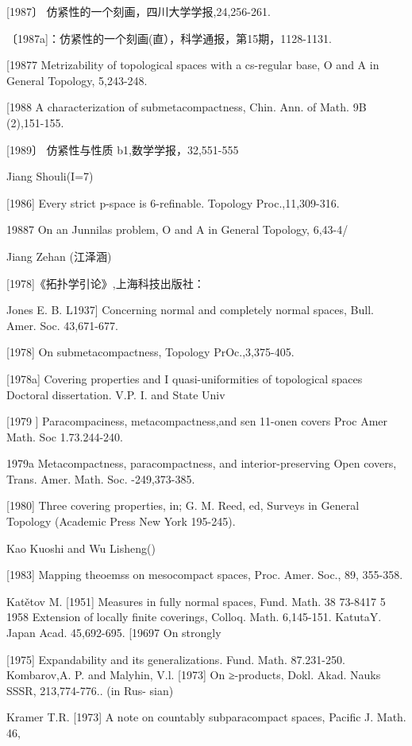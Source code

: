 \documentclass[main.tex]{subfiles}
\begin{document}
[1987〕 仿紧性的一个刻画，四川大学学报,24,256-261.

〔1987a]：仿紧性的一个刻画(直），科学通报，第15期，1128-1131.

[19877 Metrizability of topological spaces with a cs-regular base, O and A
in General Topology, 5,243-248.

[1988 A characterization of submetacompactness, Chin. Ann. of Math. 9B
(2),151-155.

[1989〕 仿紧性与性质 b1,数学学报，32,551-555

\noindent Jiang Shouli(I=7)

[1986] Every strict p-space is 6-refinable. Topology Proc.,11,309-316.

19887 On an Junnilas problem, O and A in General Topology, 6,43-4/

Jiang Zehan (江泽涵)

[1978]《拓扑学引论》,上海科技出版社：

\noindent Jones E. B.
L1937] Concerning normal and completely normal spaces, Bull. Amer. Soc.
43,671-677.

[1978]
On submetacompactness, Topology PrOc.,3,375-405.

[1978a]
Covering properties and
I quasi-uniformities of topological spaces
Doctoral dissertation. V.P. I. and State Univ

[1979 ]
Paracompaciness,
metacompactness,and
sen
11-onen
covers
Proc
Amer Math. Soc
1.73.244-240.

1979a Metacompactness, paracompactness, and
interior-preserving Open
covers, Trans. Amer. Math. Soc. -249,373-385.

[1980]
Three covering properties, in; G. M. Reed, ed, Surveys in General
Topology (Academic Press New York 195-245).

Kao Kuoshi and Wu Lisheng()

[1983]
Mapping theoemss on mesocompact spaces, Proc. Amer. Soc., 89,
355-358.

Kat\v{e}tov M.
[1951]
Measures in fully normal spaces, Fund. Math. 38 73-8417
5 1958 Extension
of locally finite coverings, Colloq. Math. 6,145-151.
KatutaY.
Japan Acad. 45,692-695.
[19697
On strongly

[1975]
Expandability and its generalizations. Fund. Math. 87.231-250.
Kombarov,A. P. and Malyhin, V.l.
[1973] On ≥-products, Dokl. Akad. Nauks SSSR, 213,774-776.. (in Rus-
sian)

Kramer T.R.
[1973]
A note on countably subparacompact spaces, Pacific J. Math. 46,
\end{document}
